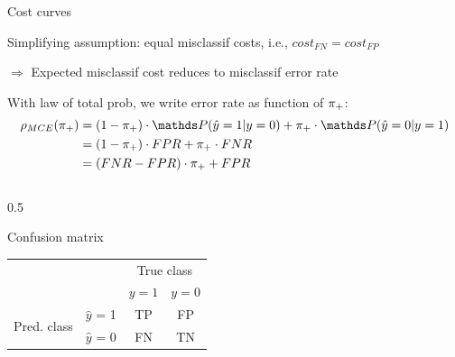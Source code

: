 \documentclass[11pt,compress,t,notes=noshow, xcolor=table]{beamer}
\begin{document}



\begin{vbframe}{Cost curves}
\small

Simplifying assumption: equal misclassif costs, i.e., $cost_{FN} = cost_{FP}$

$\Rightarrow$ Expected misclassif cost reduces to misclassif error rate

With law of total prob, we write error rate as function of $\pi_{+}$:
\begin{align*}
\rho_{MCE}(\rp)
&= (1 - \rp) \cdot \P(\hat y = 1 | y = 0) + \rp \cdot \P(\hat y = 0 | y = 1) \\
&= (1 - \rp) \cdot FPR + \rp \cdot FNR \\
&= (FNR - FPR) \cdot \rp + FPR
\end{align*}

\begin{columns}[T]
\begin{column}{0.5\textwidth}

\centerline{Confusion matrix}
\begin{tabular}{cc|cc}
    & &\multicolumn{2}{c}{True class} \\
    & & $y=1$ & $y=0$  \\
 \hline
    \multirow{2}{*}{\parbox{0.5cm}{Pred. class}}& $\hat y$ = 1     & TP                 & FP\\
    & $\hat y$ = 0 & FN              & TN\\
\end{tabular}
\end{column}


\end{columns}
\end{vbframe}
\end{document}
